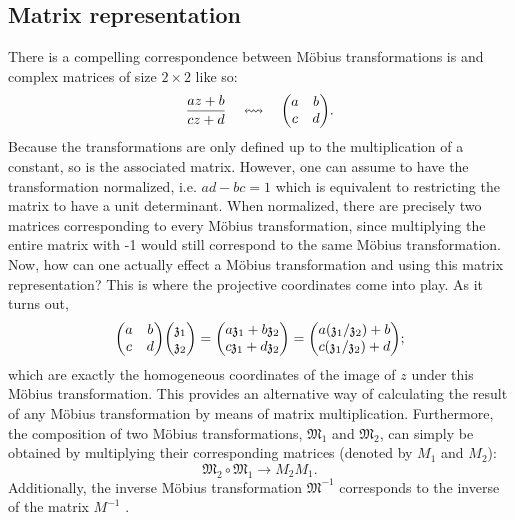 \subsection{Matrix representation}
There is a compelling correspondence between Möbius transformations is and complex matrices of size \(2\times 2\) like so:
\[ \frac{az + b}{cz + d} \corresponds \mqty(a & b \\ c & d).\] 
Because the transformations are only defined up to the multiplication of a constant, so is the associated matrix. However, one can assume to have the transformation normalized, i.e. \(ad - bc = 1\) which is equivalent to restricting the matrix to have a unit determinant.  When normalized, there are precisely two matrices corresponding to every Möbius transformation, since multiplying the entire matrix with -1 would still correspond to the same Möbius transformation. Now, how can one actually effect a Möbius transformation and using this matrix representation? This is where the projective coordinates come into play. As it turns out, 
\[ 
    \mqty(a & b\\ c & d)\mqty(\mathfrak{z}_1\\\mathfrak{z}_2)
    = \mqty(a\mathfrak{z}_1 + b\mathfrak{z}_2\\c\mathfrak{z}_1 + d\mathfrak{z}_2)
    =\mqty(a(\mathfrak{z}_1/\mathfrak{z}_2) + b\\c(\mathfrak{z}_1/\mathfrak{z}_2) + d);
\]
which are exactly the homogeneous coordinates of the image of \(z\) under this Möbius transformation. This provides an alternative way of calculating the result of any Möbius transformation by means of matrix multiplication. Furthermore, the composition of two Möbius transformations, $\mathfrak{M}_1$ and $\mathfrak{M}_2$, can simply be obtained by multiplying their corresponding matrices (denoted by \(M_1\) and \(M_2\)):
\[\mathfrak{M}_2 \circ \mathfrak{M}_1 \to M_2 M_1.\]
Additionally, the inverse Möbius transformation \(\mathfrak{M}^{-1}\) corresponds to the inverse of the matrix \(M^{-1}\) \cite{Needham2021}.


